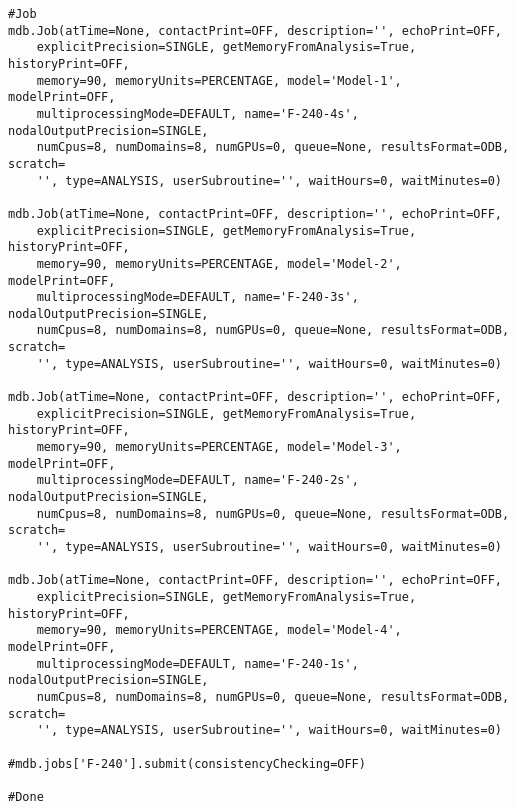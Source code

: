 \documentclass[12pt, letterpaper, oneside]{report}
\begin{document}
\begin{lstlisting}[frame=none]
#Job
mdb.Job(atTime=None, contactPrint=OFF, description='', echoPrint=OFF, 
    explicitPrecision=SINGLE, getMemoryFromAnalysis=True, historyPrint=OFF, 
    memory=90, memoryUnits=PERCENTAGE, model='Model-1', modelPrint=OFF, 
    multiprocessingMode=DEFAULT, name='F-240-4s', nodalOutputPrecision=SINGLE, 
    numCpus=8, numDomains=8, numGPUs=0, queue=None, resultsFormat=ODB, scratch=
    '', type=ANALYSIS, userSubroutine='', waitHours=0, waitMinutes=0)

mdb.Job(atTime=None, contactPrint=OFF, description='', echoPrint=OFF, 
    explicitPrecision=SINGLE, getMemoryFromAnalysis=True, historyPrint=OFF, 
    memory=90, memoryUnits=PERCENTAGE, model='Model-2', modelPrint=OFF, 
    multiprocessingMode=DEFAULT, name='F-240-3s', nodalOutputPrecision=SINGLE, 
    numCpus=8, numDomains=8, numGPUs=0, queue=None, resultsFormat=ODB, scratch=
    '', type=ANALYSIS, userSubroutine='', waitHours=0, waitMinutes=0)
	
mdb.Job(atTime=None, contactPrint=OFF, description='', echoPrint=OFF, 
    explicitPrecision=SINGLE, getMemoryFromAnalysis=True, historyPrint=OFF, 
    memory=90, memoryUnits=PERCENTAGE, model='Model-3', modelPrint=OFF, 
    multiprocessingMode=DEFAULT, name='F-240-2s', nodalOutputPrecision=SINGLE, 
    numCpus=8, numDomains=8, numGPUs=0, queue=None, resultsFormat=ODB, scratch=
    '', type=ANALYSIS, userSubroutine='', waitHours=0, waitMinutes=0)
	
mdb.Job(atTime=None, contactPrint=OFF, description='', echoPrint=OFF, 
    explicitPrecision=SINGLE, getMemoryFromAnalysis=True, historyPrint=OFF, 
    memory=90, memoryUnits=PERCENTAGE, model='Model-4', modelPrint=OFF, 
    multiprocessingMode=DEFAULT, name='F-240-1s', nodalOutputPrecision=SINGLE, 
    numCpus=8, numDomains=8, numGPUs=0, queue=None, resultsFormat=ODB, scratch=
    '', type=ANALYSIS, userSubroutine='', waitHours=0, waitMinutes=0)

#mdb.jobs['F-240'].submit(consistencyChecking=OFF)

#Done
\end{lstlisting}
\end{document}
